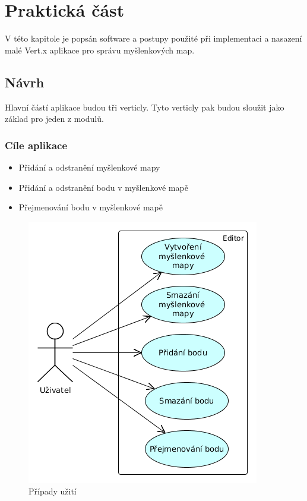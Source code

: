 
\chapter{Praktická část}

V této kapitole je popsán software a postupy použité při implementaci a nasazení malé Vert.x aplikace pro správu myšlenkových map.

\section{Návrh}

Hlavní částí aplikace budou tři verticly. Tyto verticly pak budou sloužit jako základ pro jeden z modulů.

\subsection{Cíle aplikace}\label{sub:use_case}

\begin{itemize}
\item Přidání a odstranění myšlenkové mapy
\item Přidání a odstranění bodu v myšlenkové mapě
\item Přejmenování bodu v myšlenkové mapě
\end{itemize}

\begin{figure}
\begin{centering}
\includegraphics[scale=0.5]{obrazky/use_case}
\par\end{centering}
\caption{Případy užití\label{fig:use_case}}
\end{figure}

